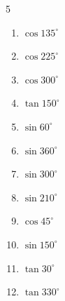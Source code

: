 \begin{multicols}{5}
\begin{enumerate}
  \item $\displaystyle \cos{135^\circ}$


  \item $\displaystyle \cos{225^\circ}$


  \item $\displaystyle \cos{300^\circ}$


  \item $\displaystyle \tan{150^\circ}$


  \item $\displaystyle \sin{60^\circ}$


  \item $\displaystyle \sin{360^\circ}$

        \phantom{$\displaystyle =0$}

\columnbreak %

  \item $\displaystyle \sin{300^\circ}$


  \item $\displaystyle \sin{210^\circ}$


  \item $\displaystyle \cos{45^\circ}$


  \item $\displaystyle \sin{150^\circ}$


  \item $\displaystyle \tan{30^\circ}$


  \item $\displaystyle \tan{330^\circ}$



\end{enumerate}
\end{multicols}
